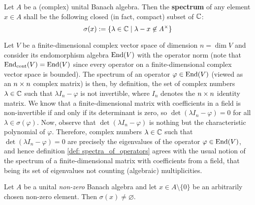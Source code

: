         \begin{definition} \label{def: spectra_of_operators}
            Let $A$ be a (complex) unital Banach algebra. Then the \textbf{spectrum} of any element $x \in A$ shall be the following closed (in fact, compact) subset of $\mathbb{C}$:
                $$\sigma(x) := \{\lambda \in \bbC \mid \lambda - x \not \in A^{\x}\}$$
        \end{definition}
        \begin{example} \label{example: spectral_elements_are_eigenvalues}
            Let $V$ be a finite-dimensional complex vector space of dimension $n = \dim V$ and consider its endomorphism algebra $\mathrm{End}(V)$ with the operator norm (note that $\mathrm{End}_{\mathrm{cont}}(V) = \mathrm{End}(V)$ since every operator on a finite-dimensional complex vector space is bounded). The spectrum of an operator $\varphi \in \mathrm{End}(V)$ (viewed as an $n \x n$ complex matrix) is then, by definition, the set of complex numbers $\lambda \in \mathbb{C}$ such that $\lambda I_n - \varphi$ is not invertible, where $I_n$ denotes the $n \x n$ identity matrix. We know that a finite-dimensional matrix with coefficients in a field is non-invertible if and only if its determinant is zero, so $\det(\lambda I_n - \varphi) = 0$ for all $\lambda \in \sigma(\varphi)$. Now, observe that $\det(\lambda I_n - \varphi)$ is nothing but the characteristic polynomial of $\varphi$. Therefore, complex numbers $\lambda \in \mathbb{C}$ such that $\det(\lambda I_n - \varphi) = 0$ are precisely the eigenvalues of the operator $\varphi \in \mathrm{End}(V)$, and hence definition \ref{def: spectra_of_operators} agrees with the usual notion of the spectrum of a finite-dimensional matrix with coefficients from a field, that being its set of eigenvalues not counting (algebraic) multiplicities.
        \end{example}
        \begin{proposition} \label{prop: spectra_of_non_zero_operators_are_non_empty}
            Let $A$ be a unital \textit{non-zero} Banach algebra and let $x \in A \setminus \{0\}$ be an arbitrarily chosen non-zero element. Then $\sigma(x) \not = \varnothing$. 
        \end{proposition}
